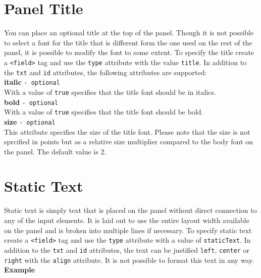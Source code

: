\section{Panel Title}

You can place an optional title at the top of the panel. Though it is
not possible to select a font for the title that is different form the
one used on the rest of the panel, it is possible to modify the font to
some extent. To specify the title create a \texttt{<field>} tag and use
the \texttt{type} attribute with the value \texttt{title}. In addition
to the \texttt{txt} and \texttt{id} attributes, the following attributes
are supported:\\

\textbf{italic} \texttt{- optional}\\

With a value of \texttt{true} specifies that the title font should be in italics.\\

\textbf{bold} \texttt{- optional}\\

With a value of \texttt{true} specifies that the title font should be bold.\\

\textbf{size} \texttt{- optional}\\

This attribute specifies the size of the title font. Please note that
the size is not sprcified in points but as a relative size multiplier
compared to the body font on the panel. The default value is 2.\\

\section{Static Text}

Static text is simply text that is placed on the panel without direct
connection to any of the input elements. It is laid out to use the
entire layout width available on the panel and is broken into multiple
lines if necessary. To specify static text create a \texttt{<field>} tag
and use the \texttt{type} attribute with a value of \texttt{staticText}.
In addition to the \texttt{txt} and \texttt{id} attributes, the text can
be justified \texttt{left}, \texttt{center} or \texttt{right} with the
\texttt{align} attribute. It is not possible to format this text in any way.\\

\textbf{Example}\\

